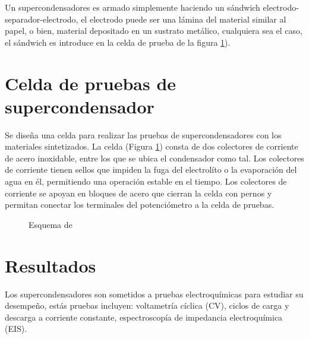Un supercondensadores es armado simplemente haciendo un sándwich electrodo-separador-electrodo, el electrodo puede ser una lámina del material similar al papel, o bien, material depositado en un sustrato metálico, cualquiera sea el caso, el sándwich es introduce en la celda de prueba de la figura \ref{fig:celda_de_pruebas_SC}). 

\section{Celda de pruebas de supercondensador}
Se diseña una celda para realizar las pruebas de supercondensadores con los materiales sintetizados. La celda (Figura \ref{fig:celda_de_pruebas_SC}) consta de dos colectores de corriente de acero inoxidable, entre los que se ubica el condensador como tal. Los colectores de corriente tienen sellos que impiden la fuga del electrolíto o la evaporación del agua en él, permitiendo una operación estable en el tiempo. Los colectores de corriente se apoyan en bloques de acero que cierran la celda con pernos y permitan conectar los terminales del potenciómetro a la celda de pruebas.

\begin{figure}[h!]
	\centering
	\caption{Esquema de }
	\label{fig:celda_de_pruebas_SC}
\end{figure}


\section{Resultados}
Los supercondensadores son sometidos a pruebas electroquímicas para estudiar su desempeño, estás pruebas incluyen: voltametría cíclica (CV), ciclos de carga y descarga a corriente constante, espectroscopía de impedancia electroquímica (EIS).
